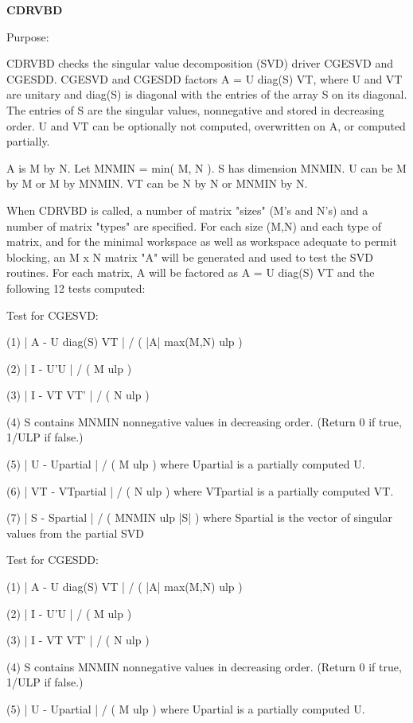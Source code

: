 {\bfseries C\+D\+R\+V\+B\+D} 

\begin{DoxyParagraph}{Purpose\+: }
\begin{DoxyVerb} CDRVBD checks the singular value decomposition (SVD) driver CGESVD
 and CGESDD.
 CGESVD and CGESDD factors A = U diag(S) VT, where U and VT are
 unitary and diag(S) is diagonal with the entries of the array S on
 its diagonal. The entries of S are the singular values, nonnegative
 and stored in decreasing order.  U and VT can be optionally not
 computed, overwritten on A, or computed partially.

 A is M by N. Let MNMIN = min( M, N ). S has dimension MNMIN.
 U can be M by M or M by MNMIN. VT can be N by N or MNMIN by N.

 When CDRVBD is called, a number of matrix "sizes" (M's and N's)
 and a number of matrix "types" are specified.  For each size (M,N)
 and each type of matrix, and for the minimal workspace as well as
 workspace adequate to permit blocking, an  M x N  matrix "A" will be
 generated and used to test the SVD routines.  For each matrix, A will
 be factored as A = U diag(S) VT and the following 12 tests computed:

 Test for CGESVD:

 (1)   | A - U diag(S) VT | / ( |A| max(M,N) ulp )

 (2)   | I - U'U | / ( M ulp )

 (3)   | I - VT VT' | / ( N ulp )

 (4)   S contains MNMIN nonnegative values in decreasing order.
       (Return 0 if true, 1/ULP if false.)

 (5)   | U - Upartial | / ( M ulp ) where Upartial is a partially
       computed U.

 (6)   | VT - VTpartial | / ( N ulp ) where VTpartial is a partially
       computed VT.

 (7)   | S - Spartial | / ( MNMIN ulp |S| ) where Spartial is the
       vector of singular values from the partial SVD

 Test for CGESDD:

 (1)   | A - U diag(S) VT | / ( |A| max(M,N) ulp )

 (2)   | I - U'U | / ( M ulp )

 (3)   | I - VT VT' | / ( N ulp )

 (4)   S contains MNMIN nonnegative values in decreasing order.
       (Return 0 if true, 1/ULP if false.)

 (5)   | U - Upartial | / ( M ulp ) where Upartial is a partially
       computed U.


\end{DoxyVerb}
\end{DoxyParagraph}

